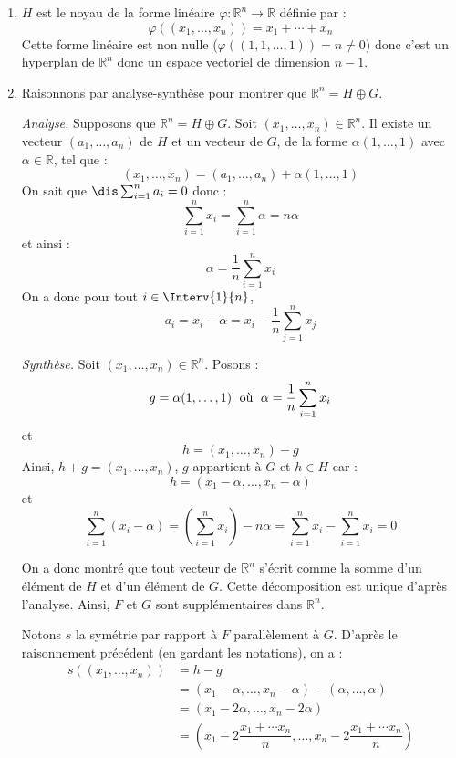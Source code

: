 \documentclass[a4paper,10pt]{report}
\begin{document}
\corr

\begin{enumerate}
\item $H$ est le noyau de la forme linéaire $\varphi : \mathbb{R}^n \rightarrow \mathbb{R}$ définie par :
$$ \varphi((x_1, \ldots, x_n))=  x_1 + \cdots + x_n$$
Cette forme linéaire est non nulle ($\varphi((1,1, \ldots, 1)) = n \neq 0$) donc c'est un hyperplan de $\mathbb{R}^n$ donc un espace vectoriel de dimension $n-1$.
\item Raisonnons par analyse-synthèse pour montrer que $\mathbb{R}^n = H \oplus G$.

\medskip

\noindent \textit{Analyse.} Supposons que $\mathbb{R}^n = H \oplus G$. Soit $(x_1, \ldots, x_n) \in \mathbb{R}^n$. Il existe un vecteur $(a_1, \ldots, a_n)$ de $H$ et un vecteur de $G$, de la forme $\alpha (1, \ldots, 1)$ avec $\alpha \in \mathbb{R}$, tel que :
$$ (x_1, \ldots, x_n) = (a_1, \ldots, a_n) + \alpha (1, \ldots, 1)$$
On sait que $\dis \sum_{i=1}^n a_i=0$ donc :
$$ \sum_{i=1}^n x_i = \sum_{i=1}^n \alpha = n \alpha$$
et ainsi :
$$ \alpha = \dfrac{1}{n} \sum_{i=1}^n x_i $$
On a donc pour tout $i \in \Interv{1}{n}$,
$$ a_i = x_i - \alpha = x_i - \dfrac{1}{n} \sum_{j=1}^n x_j$$

\medskip

\noindent \textit{Synthèse.} Soit $(x_1, \ldots , x_n) \in \mathbb{R}^n$. Posons :
$$ g = \alpha (1, \ldots, 1) \; \hbox{ où } \; \alpha =  \dfrac{1}{n} \sum_{i=1}^n x_i$$
et 
$$ h = (x_1, \ldots, x_n) - g$$
Ainsi, $h+g= (x_1, \ldots, x_n)$, $g$ appartient à $G$ et $h \in H$ car :
$$ h = (x_1-\alpha, \ldots, x_n - \alpha)$$
et
$$ \sum_{i=1}^n (x_i - \alpha)  = \left(\sum_{i=1}^n x_i \right) - n \alpha = \sum_{i=1}^n x_i- \sum_{i=1}^n x_i = 0$$

\medskip

\noindent On a donc montré que tout vecteur de $\mathbb{R}^n$ s'écrit comme la somme d'un élément de $H$ et d'un élément de $G$. Cette décomposition est unique d'après l'analyse. Ainsi, $F$ et $G$ sont supplémentaires dans $\mathbb{R}^n$.

\medskip

\noindent Notons $s$ la symétrie par rapport à $F$ parallèlement à $G$. D'après le raisonnement précédent (en gardant les notations), on a :
\begin{align*}
s((x_1, \ldots, x_n)) & = h-g \\
& = (x_1-\alpha, \ldots, x_n - \alpha) - (\alpha, \ldots, \alpha) \\
& = (x_1 - 2\alpha, \ldots, x_n -2 \alpha) \\
& = \left( x_1 - 2 \dfrac{x_1+ \cdots x_n}{n}, \ldots,  x_n - 2 \dfrac{x_1+ \cdots x_n}{n}\right) 
\end{align*}
\end{enumerate}
\end{document}

